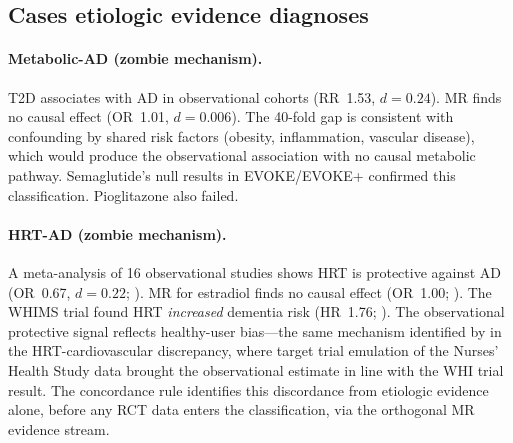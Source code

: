 \documentclass[11pt]{article}
\begin{document}
\subsection{Cases etiologic evidence diagnoses}

\paragraph{Metabolic-AD (zombie mechanism).} T2D associates with AD in observational cohorts (RR~1.53, $d = 0.24$). MR finds no causal effect (OR~1.01, $d = 0.006$). The 40-fold gap is consistent with confounding by shared risk factors (obesity, inflammation, vascular disease), which would produce the observational association with no causal metabolic pathway. Semaglutide's null results in EVOKE/EVOKE+ confirmed this classification. Pioglitazone also failed.

\paragraph{HRT-AD (zombie mechanism).} A meta-analysis of 16 observational studies shows HRT is protective against AD (OR~0.67, $d = 0.22$; \cite{song2020}). MR for estradiol finds no causal effect (OR~1.00; \cite{barth2025}). The WHIMS trial found HRT \emph{increased} dementia risk (HR~1.76; \cite{shumaker2003}). The observational protective signal reflects healthy-user bias---the same mechanism identified by \citet{hernan2008} in the HRT-cardiovascular discrepancy, where target trial emulation of the Nurses' Health Study data brought the observational estimate in line with the WHI trial result. The concordance rule identifies this discordance from etiologic evidence alone, before any RCT data enters the classification, via the orthogonal MR evidence stream.
\end{document}
